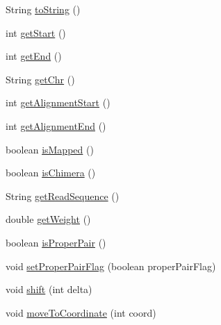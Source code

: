 \begin{DoxyCompactItemize}
\item 
String \hyperlink{classumms_1_1core_1_1alignment_1_1_abstract_paired_end_alignment_abf5f626d98261f0a917b2ca159fbda63}{to\+String} ()
\item 
int \hyperlink{classumms_1_1core_1_1alignment_1_1_abstract_paired_end_alignment_a99f17f8d510ad2798e2c0b5b886df2bc}{get\+Start} ()
\item 
int \hyperlink{classumms_1_1core_1_1alignment_1_1_abstract_paired_end_alignment_a843812c2305e69d131f2892b4b30b68e}{get\+End} ()
\item 
String \hyperlink{classumms_1_1core_1_1alignment_1_1_abstract_paired_end_alignment_a389ee80e6e6d04b7cbd55b1c533378e4}{get\+Chr} ()
\item 
int \hyperlink{classumms_1_1core_1_1alignment_1_1_abstract_paired_end_alignment_a287e7b5c0d789621212961e9a2dac052}{get\+Alignment\+Start} ()
\item 
int \hyperlink{classumms_1_1core_1_1alignment_1_1_abstract_paired_end_alignment_af6f367d03b371f8c11272b50edeb2166}{get\+Alignment\+End} ()
\item 
boolean \hyperlink{classumms_1_1core_1_1alignment_1_1_abstract_paired_end_alignment_af47f73adc6769845e2bb1811dea02f8c}{is\+Mapped} ()
\item 
boolean \hyperlink{classumms_1_1core_1_1alignment_1_1_abstract_paired_end_alignment_a9e2928564d040785988bd1670a50fa62}{is\+Chimera} ()
\item 
String \hyperlink{classumms_1_1core_1_1alignment_1_1_abstract_paired_end_alignment_a5411152f2e68b099413caddc9dba148f}{get\+Read\+Sequence} ()
\item 
double \hyperlink{classumms_1_1core_1_1alignment_1_1_abstract_paired_end_alignment_aaf11809a0fd53aa8ad485d6ab993d7c0}{get\+Weight} ()
\item 
boolean \hyperlink{classumms_1_1core_1_1alignment_1_1_abstract_paired_end_alignment_a3b74b26023376f9451c4243674bf33ce}{is\+Proper\+Pair} ()
\item 
void \hyperlink{classumms_1_1core_1_1alignment_1_1_abstract_paired_end_alignment_a5bc12cc540194c01868fae4e7140eb44}{set\+Proper\+Pair\+Flag} (boolean proper\+Pair\+Flag)
\item 
void \hyperlink{classumms_1_1core_1_1alignment_1_1_abstract_paired_end_alignment_a49adbe8aa021ef96ac89ede1f05694df}{shift} (int delta)
\item 
void \hyperlink{classumms_1_1core_1_1alignment_1_1_abstract_paired_end_alignment_af4cbbce6715e864c1155fd105d1d853d}{move\+To\+Coordinate} (int coord)

\end{DoxyCompactItemize}
